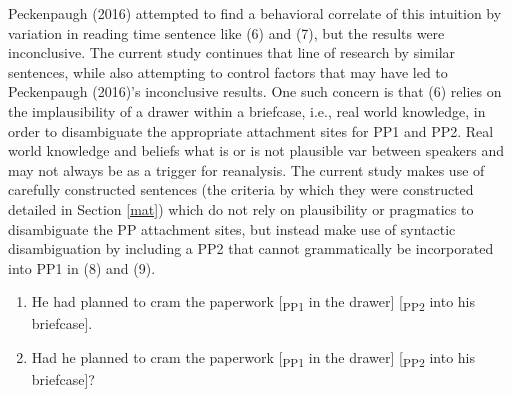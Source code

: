 \documentclass[12pt,oneside]{book}
\providecommand{\tightlist}{%
  \setlength{\itemsep}{0pt}\setlength{\parskip}{0pt}}
\begin{document}
Peckenpaugh (2016) attempted to find a behavioral correlate of this intuition by  variation in reading time  sentence like (6) and (7), but the results were inconclusive. The current study continues that line of research by  similar sentences, while also attempting to control  factors that may have led to Peckenpaugh (2016)'s inconclusive results. One such concern is that (6) relies on the  implausibility of a drawer within a briefcase, i.e.,  real world knowledge, in order to disambiguate the appropriate attachment sites for PP1 and PP2. Real world knowledge and beliefs  what is or is not plausible  var between speakers and  may not always be  as a trigger for reanalysis. The current study makes use of carefully constructed sentences (the criteria by which they were constructed  detailed in Section \ref{mat}) which do not rely on plausibility or pragmatics to disambiguate the PP attachment sites, but instead make use of  syntactic disambiguation by including a PP2 that cannot grammatically be incorporated into PP1 in (8) and (9). 

\begin{enumerate}
\def\labelenumi{(\arabic{enumi})}
\setcounter{enumi}{7}
\tightlist
\item
  He had planned to cram the paperwork {[}\textsubscript{PP1} in the drawer{]} {[}\textsubscript{PP2} into his briefcase{]}.
\item
  Had he planned to cram the paperwork {[}\textsubscript{PP1} in the drawer{]} {[}\textsubscript{PP2} into his briefcase{]}?
\end{enumerate}
\end{document}
